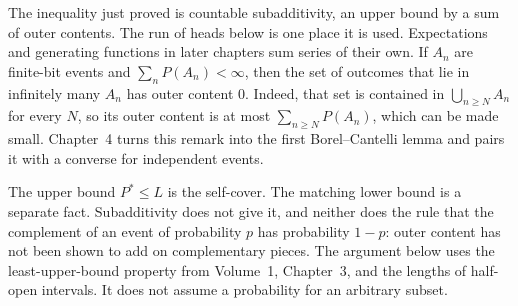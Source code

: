 The inequality just proved is countable subadditivity, an upper bound by a sum of outer contents. The run of heads below is one place it is used. Expectations and generating functions in later chapters sum series of their own. If $A_n$ are finite-bit events and $\sum_n P(A_n)<\infty$, then the set of outcomes that lie in infinitely many $A_n$ has outer content $0$. Indeed, that set is contained in $\bigcup_{n\ge N}A_n$ for every $N$, so its outer content is at most $\sum_{n\ge N}P(A_n)$, which can be made small. Chapter~4 turns this remark into the first Borel--Cantelli lemma and pairs it with a converse for independent events.

The upper bound $P^*\le L$ is the self-cover. The matching lower bound is a separate fact. Subadditivity does not give it, and neither does the rule that the complement of an event of probability $p$ has probability $1-p$: outer content has not been shown to add on complementary pieces. The argument below uses the least-upper-bound property from Volume~1, Chapter~3, and the lengths of half-open intervals. It does not assume a probability for an arbitrary subset.

